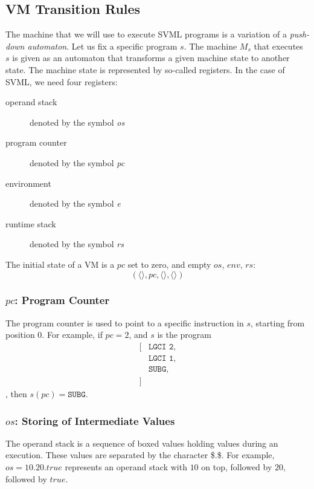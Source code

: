 \begin{appendices}
\subsection{VM Transition Rules}
\label{sec:orge6984fd}
The machine that we will use to execute SVML programs is a variation of a \emph{push-down automaton}. Let us fix a specific program \(s\). The machine \(M_s\) that executes \(s\) is given as an automaton that transforms a given machine state to another state. The machine state is represented by so-called registers.
In the case of SVML, we need four registers:
\begin{description}
\item[{operand stack}] denoted by the symbol \textit{os}
\item[{program counter}] denoted by the symbol \textit{pc}
\item[{environment}] denoted by the symbol \textit{e}
\item[{runtime stack}] denoted by the symbol \textit{rs}
\end{description}
The initial state of a VM is a \(\textit{pc}\) set to zero, and empty \(\textit{os}\), \(\textit{env}\), \(\textit{rs}\):
$$(\langle \rangle, \textit{pc}, \langle \rangle, \langle \rangle)$$

\subsubsection{\(\textit{pc}\): Program Counter}
\label{sec:org2f3bf62}
The program counter is used to point to a specific instruction in \(s\), starting from position 0.
For example, if \(\textit{pc} = 2\), and \(s\) is the program
$$\begin{aligned}
\lbrack&\texttt{LGCI 2},\\
&\texttt{LGCI 1},\\
&\texttt{SUBG},\\
\rbrack
\end{aligned}$$
, then \(s(\textit{pc}) = \texttt{SUBG}\).

\subsubsection{\(\textit{os}\): Storing of Intermediate Values}
\label{sec:org0cbe7d9}
The operand stack is a sequence of boxed values holding values during an execution. These values are separated by the character \$.\$.
For example, \(\textit{os} = 10.20.\textit{true}\) represents an operand stack with \(10\) on top, followed by \(20\), followed by \(\textit{true}\).


\end{appendices}
